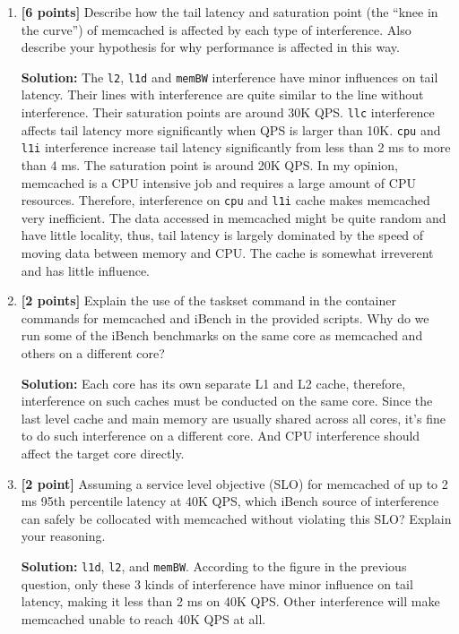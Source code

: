 \documentclass[11pt]{article}
\begin{document}
\begin{enumerate}
            \item \textbf{[6 points]} Describe how the tail latency and saturation point (the “knee in the curve”) of
            memcached is affected by each type of interference. Also describe your hypothesis for why performance is
            affected in this way.
            
            \textbf{Solution:} The \texttt{l2}, \texttt{l1d} and \texttt{memBW} interference have minor influences on tail latency. Their lines with interference are quite similar to the line without interference. Their saturation points are around 30K QPS. \texttt{llc} interference affects tail latency more significantly when QPS is larger than 10K. \texttt{cpu} and \texttt{l1i} interference increase tail latency significantly from less than 2 ms to more than 4 ms. The saturation point is around 20K QPS. In my opinion, memcached is a CPU intensive job and requires a large amount of CPU resources. Therefore, interference on \texttt{cpu} and \texttt{l1i} cache makes memcached very inefficient. The data accessed in memcached might be quite random and have little locality, thus, tail latency is largely dominated by the speed of moving data between memory and CPU. The cache is somewhat irreverent and has little influence.
            
            \item \textbf{[2 points]} Explain the use of the taskset command in the container commands for memcached and iBench
            in the provided scripts. Why do we run some of the iBench benchmarks on the same core as memcached and others on a different core?
            
            \textbf{Solution:} Each core has its own separate L1 and L2 cache, therefore, interference on such caches must be conducted on the same core. 
            Since the last level cache and main memory are usually shared across all cores, it's fine to do such interference on a different core. And CPU interference should affect the target core directly.
            
            \item \textbf{[2 point]} Assuming a service level objective (SLO) for memcached of up to 2 ms 95th percentile latency at 40K QPS,
            which iBench source of interference can safely be collocated with memcached without violating this SLO? Explain your reasoning.
            
            \textbf{Solution:} \texttt{l1d}, \texttt{l2}, and \texttt{memBW}. According to the figure in the previous question, only these 3 kinds of interference have minor influence on tail latency, making it less than 2 ms on 40K QPS. Other interference will make memcached unable to reach 40K QPS at all.
            
\end{enumerate}
\end{document}
